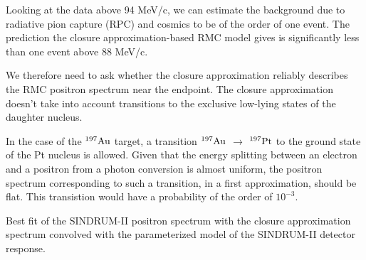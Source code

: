 \documentclass[12pt]{article}
\newcommand {\ra}        {\rightarrow}
\newcommand {\Au}[1]     {\mbox{$\rm ^{#1}Au$}}                 %
\begin{document}
Looking at the data above 94 MeV/c, we can estimate the background due to radiative
pion capture (RPC) and cosmics to be of the order of one event.
The prediction the closure approximation-based RMC model gives is significantly less
than one event above 88 MeV/c.

We therefore need to ask whether the closure approximation reliably
describes the RMC positron spectrum near the endpoint. The closure approximation
doesn't take into account transitions to the exclusive low-lying states of the daughter
nucleus.

In the case of the \Au{197} target, a transition \Au{197} $\ra$ $^{197} \rm Pt$ to
the ground state of the Pt nucleus is allowed. Given that the energy splitting between
an electron and a positron from a photon conversion is almost uniform,
the positron spectrum corresponding to such a transition, in a first approximation,
should be flat. This transistion would have a probability of the order of $10^{-3}$.

\vspace{0.1in}
 {
  \label{fig:ana_step2_ppos_best_fit}
  Best fit of the SINDRUM-II positron spectrum with the closure approximation
  spectrum convolved with the parameterized model of the SINDRUM-II detector
  response.
}
\vspace{0.1in}
\end{document}
